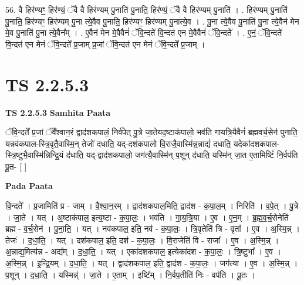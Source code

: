 \documentclass[17pt]{extarticle}
\begin{document}
56. वै हिर॑ण्यꣳ॒॒ हिर॑ण्यं॒ ॅवै वै हिर॑ण्यम् पु॒नाति॑ पु॒नाति॒ हिर॑ण्यं॒ ॅवै वै हिर॑ण्यम् पु॒नाति॑ । . हिर॑ण्यम् पु॒नाति॑ पु॒नाति॒ हिर॑ण्यꣳ॒॒ हिर॑ण्यम् पु॒ना त्ये॒वैव पु॒नाति॒ हिर॑ण्यꣳ॒॒ हिर॑ण्यम् पु॒नात्ये॒व । . पु॒ना त्ये॒वैव पु॒नाति॑ पु॒ना त्ये॒वैन॑ मेन मे॒व पु॒नाति॑ पु॒ना त्ये॒वैन᳚म् । . ए॒वैन॑ मेन मे॒वैवैनं॑ ॅवि॒न्दते॑ वि॒न्दत॑ एन मे॒वैवैनं॑ ॅवि॒न्दते᳚ । . ए॒नं॒ ॅवि॒न्दते॑ वि॒न्दत॑ एन मेनं ॅवि॒न्दते᳚ प्र॒जाम् प्र॒जां ॅवि॒न्दत॑ एन मेनं ॅवि॒न्दते᳚ प्र॒जाम् । \newline
\pagebreak
{}

\section{ TS 2.2.5.3 }

\textbf{TS 2.2.5.3 } \newline
\textbf{Samhita Paata} \newline

ॅवि॒न्दते᳚ प्र॒जां ॅवै᳚श्वान॒रं द्वाद॑शकपालं॒ निर्व॑पेत् पु॒त्रे जा॒तेयद॒ष्टाक॑पालो॒ भव॑ति गायत्रि॒यैवैनं॑ ब्रह्मवर्च॒सेन॑ पुनाति॒ यन्नव॑कपाल-स्त्रि॒वृतै॒वास्मि॒न् तेजो॑ दधाति॒ यद्-दश॑कपालो वि॒राजै॒वास्मि॑न्न॒न्नाद्यं॑ दधाति॒ यदेका॑दशकपाल- स्त्रि॒ष्टुभै॒वास्मि॑न्निन्द्रि॒यं द॑धाति॒ यद्-द्वाद॑शकपालो॒ जग॑त्यै॒वास्मि॑न् प॒शून् द॑धाति॒ यस्मि॑न् जा॒त ए॒तामिष्टिं॑ नि॒र्वप॑ति पू॒त- [  ] \newline

\textbf{Pada Paata} \newline

वि॒न्दते᳚ । प्र॒जामिति॑ प्र - जाम् । वै॒श्वा॒न॒रम् । द्वाद॑शकपाल॒मिति॒ द्वाद॑श - क॒पा॒ल॒म् । निरिति॑ । व॒पे॒त् । पु॒त्रे । जा॒ते । यत् । अ॒ष्टाक॑पाल॒ इत्य॒ष्टा - क॒पा॒लः॒ । भव॑ति । गा॒य॒त्रि॒या । ए॒व । ए॒न॒म् । ब्र॒ह्म॒व॒र्च॒सेनेति॑ ब्रह्म - व॒र्च॒सेन॑ । पु॒ना॒ति॒ । यत् । नव॑कपाल॒ इति॒ नव॑ - क॒पा॒लः॒ । त्रि॒वृतेति॑ त्रि - वृता᳚ । ए॒व । अ॒स्मि॒न्न् । तेजः॑ । द॒धा॒ति॒ । यत् । दश॑कपाल॒ इति॒ दश॑ - क॒पा॒लः॒ । वि॒राजेति॑ वि - राजा᳚ । ए॒व । अ॒स्मि॒न्न् । अ॒न्नाद्य॒मित्य॑न्न - अद्य᳚म् । द॒धा॒ति॒ । यत् । एका॑दशकपाल॒ इत्येका॑दश - क॒पा॒लः॒ । त्रि॒ष्टुभा᳚ । ए॒व । अ॒स्मि॒न्न् । इ॒न्द्रि॒यम् । द॒धा॒ति॒ । यत् । द्वाद॑शकपाल॒ इति॒ द्वाद॑श - क॒पा॒लः॒ । जग॑त्या । ए॒व । अ॒स्मि॒न्न् । प॒शून् । द॒धा॒ति॒ । यस्मिन्न्॑ । जा॒ते । ए॒ताम् । इष्टि᳚म् । नि॒र्वप॒तीति॑ निः - वप॑ति । पू॒तः ।  \newline
\end{document}
